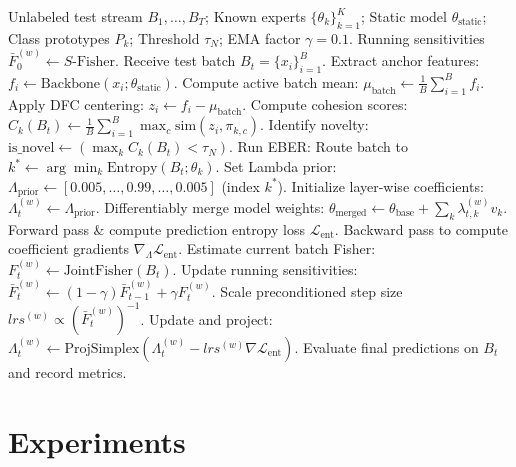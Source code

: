 \documentclass{article}
\theoremstyle{plain}
\theoremstyle{definition}
\theoremstyle{remark}
\begin{document}
\begin{algorithm}[tb]
\caption{The D-TT-Fisher-DFC Test-Time Adaptation Cycle}
\label{alg:framework}
\begin{algorithmic}[1]
 Unlabeled test stream $B_1, \ldots, B_T$; Known experts $\{\theta_k\}_{k=1}^K$; Static model $\theta_{\text{static}}$; Class prototypes $P_k$; Threshold $\tau_N$; EMA factor $\gamma=0.1$.
 Running sensitivities $\bar{F}_0^{(w)} \leftarrow S\text{-Fisher}$.
  \STATE Receive test batch $B_t = \{x_i\}_{i=1}^B$.
  \STATE Extract anchor features: $f_i \leftarrow \text{Backbone}(x_i; \theta_{\text{static}})$.
  \STATE Compute active batch mean: $\mu_{\text{batch}} \leftarrow \frac{1}{B}\sum_{i=1}^B f_i$.
  \STATE Apply DFC centering: $z_i \leftarrow f_i - \mu_{\text{batch}}$.
  \STATE Compute cohesion scores: \\
         $C_k(B_t) \leftarrow \frac{1}{B}\sum_{i=1}^B \max_c \text{sim}(z_i, \pi_{k,c})$.
  \STATE Identify novelty: $\text{is\_novel} \leftarrow (\max_k C_k(B_t) < \tau_N)$.
  \STATE Run EBER: Route batch to $k^* \leftarrow \arg\min_k \text{Entropy}(B_t; \theta_k)$.
  \STATE Set Lambda prior: $\Lambda_{\text{prior}} \leftarrow [0.005, \ldots, 0.99, \dots, 0.005]$ (index $k^*$).
  \STATE Initialize layer-wise coefficients: $\Lambda_t^{(w)} \leftarrow \Lambda_{\text{prior}}$.
  \STATE Differentiably merge model weights: $\theta_{\text{merged}} \leftarrow \theta_{\text{base}} + \sum_k \lambda_{t, k}^{(w)} v_k$.
  \STATE Forward pass \& compute prediction entropy loss $\mathcal{L}_{\text{ent}}$.
  \STATE Backward pass to compute coefficient gradients $\nabla_{\Lambda} \mathcal{L}_{\text{ent}}$.
  \STATE Estimate current batch Fisher: $F_t^{(w)} \leftarrow \text{JointFisher}(B_t)$.
  \STATE Update running sensitivities: \\
         $\bar{F}_t^{(w)} \leftarrow (1-\gamma)\bar{F}_{t-1}^{(w)} + \gamma F_t^{(w)}$.
  \STATE Scale preconditioned step size $lrs^{(w)} \propto (\bar{F}_t^{(w)})^{-1}$.
  \STATE Update and project: $\Lambda_t^{(w)} \leftarrow \text{ProjSimplex}(\Lambda_t^{(w)} - lrs^{(w)} \nabla \mathcal{L}_{\text{ent}})$.
  \STATE Evaluate final predictions on $B_t$ and record metrics.
\ENDFOR
\end{algorithmic}
\end{algorithm}

\section{Experiments}
\label{sec:experiments}
\end{document}
